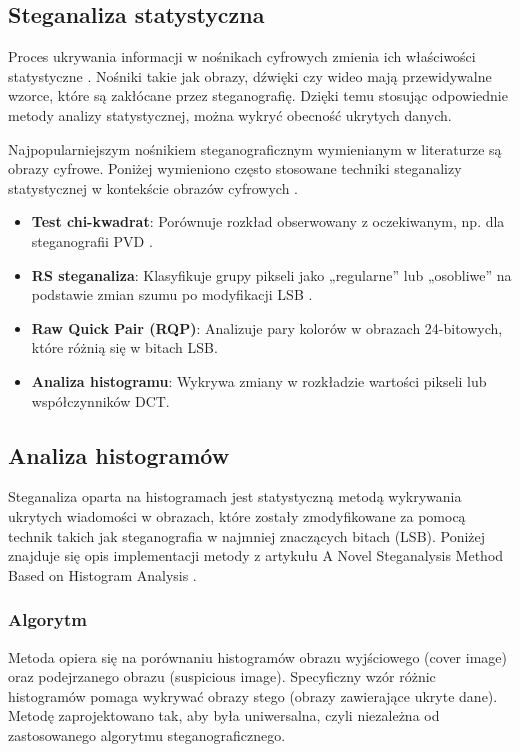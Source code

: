 \subsection{Steganaliza statystyczna}

Proces ukrywania informacji w nośnikach cyfrowych zmienia ich właściwości statystyczne \cite{stat_stego_study}. Nośniki takie jak 
obrazy, dźwięki czy wideo mają przewidywalne wzorce, które są zakłócane przez steganografię. Dzięki temu 
stosując odpowiednie metody analizy statystycznej, można wykryć obecność ukrytych danych.

Najpopularniejszym nośnikiem steganograficznym wymienianym w literaturze są obrazy cyfrowe. Poniżej wymieniono 
często stosowane techniki steganalizy statystycznej w kontekście obrazów cyfrowych \cite{Michaylov23012024}.
\begin{itemize}
    \item \textbf{Test chi-kwadrat}: Porównuje rozkład obserwowany z oczekiwanym, np. dla steganografii PVD \cite{chisquare}.
    \item \textbf{RS steganaliza}: Klasyfikuje grupy pikseli jako „regularne” lub „osobliwe” na podstawie zmian szumu po modyfikacji LSB \cite{RS}.
    \item \textbf{Raw Quick Pair (RQP)}: Analizuje pary kolorów w obrazach 24-bitowych, które różnią się w bitach LSB.
    \item \textbf{Analiza histogramu}: Wykrywa zmiany w rozkładzie wartości pikseli lub współczynników DCT.
\end{itemize}

\subsection{Analiza histogramów}

Steganaliza oparta na histogramach jest statystyczną metodą wykrywania ukrytych wiadomości w obrazach, 
które zostały zmodyfikowane za pomocą technik takich jak steganografia w najmniej znaczących bitach (LSB). 
Poniżej znajduje się opis implementacji metody z artykułu A Novel Steganalysis Method Based
on Histogram Analysis \cite{histogram_steg}.

\subsubsection{Algorytm}

Metoda opiera się na porównaniu histogramów obrazu wyjściowego (cover image) oraz podejrzanego obrazu 
(suspicious image). Specyficzny wzór różnic histogramów pomaga wykrywać obrazy stego (obrazy zawierające 
ukryte dane). Metodę zaprojektowano tak, aby była uniwersalna, czyli niezależna od zastosowanego algorytmu 
steganograficznego.

